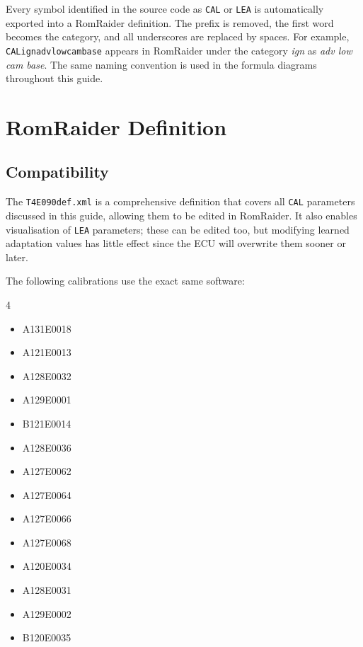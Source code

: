 \documentclass[a4paper,11pt]{article}
\renewcommand{\_}{\oldunderscore\allowbreak}
\begin{document}
Every symbol identified in the source code as \texttt{CAL\_} or \texttt{LEA\_}
is automatically exported into a RomRaider definition. The prefix is removed,
the first word becomes the category, and all underscores are replaced by
spaces. For example, \texttt{CAL\_ign\_adv\_low\_cam\_base} appears in
RomRaider under the category \emph{ign} as \emph{adv low cam base}. The same
naming convention is used in the formula diagrams throughout this guide.

\section{RomRaider Definition}

\subsection{Compatibility}

The \texttt{T4E090\_def.xml} is a comprehensive definition that covers all
\texttt{CAL\_} parameters discussed in this guide, allowing them to be edited
in RomRaider. It also enables visualisation of \texttt{LEA\_} parameters;
these can be edited too, but modifying learned adaptation values has little
effect since the ECU will overwrite them sooner or later.

The following calibrations use the exact same software:

\begin{multicols}{4}
\begin{itemize}
	\item A131E0018
	\item A121E0013
	\item A128E0032
	\item A129E0001
	\item B121E0014
	\item A128E0036
	\item A127E0062
	\item A127E0064
	\item A127E0066
	\item A127E0068
	\item A120E0034
	\item A128E0031
	\item A129E0002
	\item B120E0035
\end{itemize}
\end{multicols}
\end{document}
